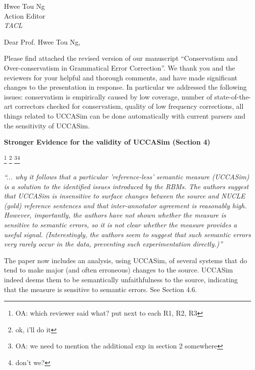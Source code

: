 \documentclass[11pt,letterpaper]{letter}
\newcommand{\oa}[1]{\footnote{\color{red}OA: #1}}
\begin{document}
\begin{letter}{%
Hwee Tou Ng\\
Action Editor\\
{\em TACL}\\
}



\vspace{.5cm}

  \opening{Dear Prof. Hwee Tou Ng,}


\vspace{.5cm}
  
  Please find attached the revised version of our manuscript ``Conservatism and Over-conservatism in Grammatical Error Correction''. We thank you and the reviewers for your helpful and thorough comments, and have made significant changes to the presentation in response. In particular we addressed the following issues: conservatism is empirically caused by low coverage, number of state-of-the-art correctors checked for conservatism, quality of low frequency corrections, all things related to UCCASim can be done automatically with current parsers and the sensitivity of UCCASim.

\vspace{.5cm}

{\large\bf Stronger Evidence for the validity of UCCASim (Section 4)}

\oa{which reviewer said what? put next to each R1, R2, R3} \footnote{ok, i'll do it}
\oa{we need to mention the additional exp in section 2 somewhere}\footnote{don't we?}

\emph{``... why it follows that a
	particular 'reference-less' semantic measure (UCCASim) is a solution to the
	identified issues introduced by the RBMs. The authors suggest that UCCASim
	is insensitive to surface changes between the source and NUCLE (gold)
	reference sentences and that inter-annotator agreement is reasonably high.
	However, importantly, the authors have not shown whether the measure is
	sensitive to semantic errors, so it is not clear whether the measure
	provides a useful signal. (Interestingly, the authors seem to suggest that
	such semantic errors very rarely occur in the data, preventing such
	experimentation directly.)''
}

The paper now includes an analysis, using UCCASim, of several systems that do tend to
make major (and often erroneous) changes to the source. UCCASim indeed deems them to be semantically
unfaithfulness to the source, indicating that the measure is sensitive to semantic errors. See Section 4.6.


\end{letter}
\end{document}
